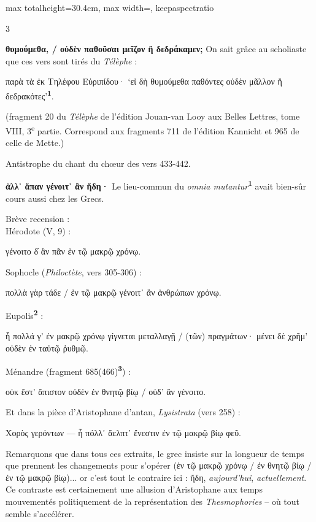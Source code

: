 \documentclass[11pt,twoside]{book}
\newcommand{\italique}[1]{\textit{#1}}
\newcommand{\citComm}[1]{\begin{quoting}[vskip=0.4pt,leftmargin=0.7em,rightmargin=0.2em]#1\end{quoting}}
\newcommand{\nieme}[1]{#1\textsuperscript{e}}
\newcommand{\grec}[1]{{\policeGr #1}}
\newcommand{\latin}[1]{\textit{#1}}
\newcommand{\marqueur}[1]{\textsuperscript{\color{rubricRed}\textbf{#1}}}
\begin{document}
\begin{adjustbox}{max totalheight=30.4cm, max width=\textwidth, keepaspectratio}
\begin{minipage}{\textwidth}
{\begin{multicols}{3}
\par\vspace{1.5pt}
 \textbf{θυμούμεθα, / οὐδὲν παθοῦσαι μεῖζον ἢ δεδράκαμεν;} On sait grâce au scholiaste que ces vers sont tirés du \italique{Télèphe} :
\citComm{\grec{παρὰ τὰ ἐκ Τηλέφου Εὐριπίδου· `εἰ δὴ θυμούμεθα παθόντες οὐδὲν μᾶλλον ἢ δεδρακότες'\marqueur{1}.}}
\par\vspace{1.5pt}
\noindent (fragment 20 du \italique{Télèphe} de l'édition Jouan-van Looy aux Belles Lettres, tome VIII, \nieme{3} partie. Correspond aux fragments 711 de l'édition Kannicht et 965 de celle de Mette.)
\par\vspace{1.5pt}
 \textbf{} Antistrophe du chant du chœur des vers 433-442.
\par\vspace{1.5pt}
 \textbf{ἀλλ᾽ ἅπαν γένοιτ᾽ ἂν ἤδη·} Le lieu-commun du \latin{omnia mutantur}\marqueur{1} avait bien-sûr cours aussi chez les Grecs.
\par\vspace{1.5pt}
\noindent Brève recension : \\ Hérodote (V, 9) :
\citComm{γένοιτο δ̓ ἂν πᾶν ἐν τῷ μακρῷ χρόνῳ.}
\par\vspace{1.5pt}
\noindent Sophocle (\italique{Philoctète}, vers 305-306) :
\citComm{πολλὰ γὰρ τάδε / ἐν τῷ μακρῷ γένοιτ᾽ ἂν ἀνθρώπων χρόνῳ.}
\par\vspace{1.5pt}
\noindent Eupolis\marqueur{2} :
\citComm{ἦ πολλά γ' ἐν μακρῷ χρόνῳ γίγνεται μεταλλαγῇ / (τῶν) πραγμάτων· μένει δὲ χρῆμ' οὐδὲν ἐν ταὐτῷ ῥυθμῷ.}
\par\vspace{1.5pt}
\noindent Ménandre (fragment 685(466)\marqueur{3}) :
\citComm{οὐκ ἔστ' ἄπιστον οὐδὲν ἐν θνητῷ βίῳ / οὐδ' ἂν γένοιτο.}
\par\vspace{1.5pt}
\noindent Et dans la pièce d'Aristophane d'antan, \italique{Lysistrata} (vers 258) :
\citComm{Χορὸς γερόντων --- ἦ πόλλ᾽ ἄελπτ᾽ ἔνεστιν ἐν τῷ μακρῷ βίῳ φεῦ.}
\par\vspace{1.5pt}
\noindent Remarquons que dans tous ces extraits, le grec insiste sur la longueur de temps que prennent les changements pour s'opérer (ἐν τῷ μακρῷ χρόνῳ / ἐν θνητῷ βίῳ / ἐν τῷ μακρῷ βίῳ)... or c'est tout le contraire ici : ἤδη, \italique{aujourd'hui}, \italique{actuellement}. Ce contraste est certainement une allusion d'Aristophane aux temps mouvementés politiquement de la représentation des \italique{Thesmophories} -- où tout semble s'accélérer.

\end{multicols}}
\end{minipage}
\end{adjustbox}
\end{document}

